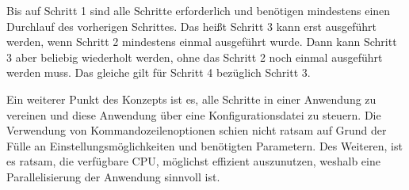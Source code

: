 Bis auf Schritt 1 sind alle Schritte erforderlich und benötigen mindestens einen Durchlauf des vorherigen Schrittes. Das heißt Schritt 3 kann erst ausgeführt werden, wenn Schritt 2 mindestens einmal ausgeführt wurde. Dann kann Schritt 3 aber beliebig wiederholt werden, ohne das Schritt 2 noch einmal ausgeführt werden muss. Das gleiche gilt für Schritt 4 bezüglich Schritt 3.

Ein weiterer Punkt des Konzepts ist es, alle Schritte in einer Anwendung zu vereinen und diese Anwendung über eine Konfigurationsdatei zu steuern. Die Verwendung von Kommandozeilenoptionen schien nicht ratsam auf Grund der Fülle an Einstellungsmöglichkeiten und benötigten Parametern. Des Weiteren, ist es ratsam, die verfügbare CPU, möglichst effizient auszunutzen, weshalb eine Parallelisierung der Anwendung sinnvoll ist.


